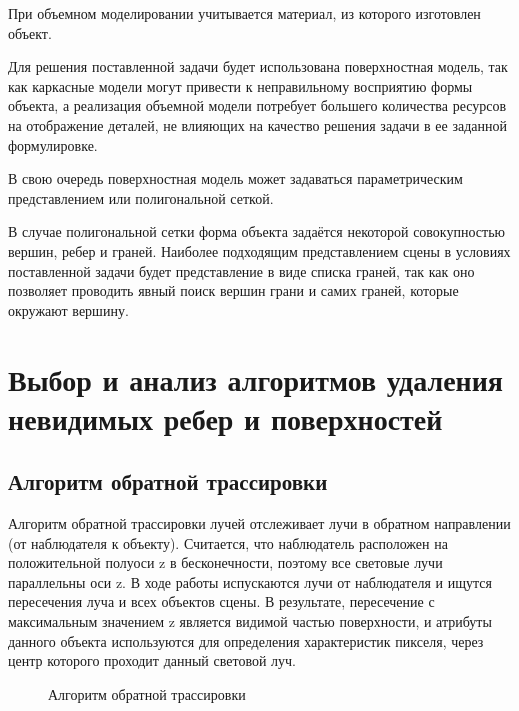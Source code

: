 При объемном моделировании учитывается материал, из которого изготовлен объект.

Для решения поставленной задачи будет использована поверхностная модель, так как каркасные модели могут привести к неправильному восприятию формы объекта, а реализация объемной модели потребует большего количества ресурсов на отображение деталей, не влияющих на качество решения задачи в ее заданной формулировке.

В свою очередь поверхностная модель может задаваться параметрическим представлением или полигональной сеткой.

В случае полигональной сетки форма объекта задаётся некоторой совокупностью вершин, ребер и граней. Наиболее подходящим представлением сцены в условиях поставленной задачи будет представление в виде списка граней, так как оно позволяет проводить явный поиск вершин грани и самих граней, которые окружают вершину.

\section{Выбор и анализ алгоритмов удаления невидимых ребер и поверхностей}

\subsection{Алгоритм обратной трассировки}

Алгоритм обратной трассировки лучей отслеживает лучи в обратном направлении (от наблюдателя к объекту). Считается, что наблюдатель расположен на положительной полуоси z в бесконечности, поэтому все световые лучи параллельны оси z. В ходе работы испускаются лучи от наблюдателя и ищутся пересечения луча и всех объектов сцены. В результате, пересечение с максимальным значением z является видимой частью поверхности, и атрибуты данного объекта используются для определения характеристик пикселя, через центр которого проходит данный световой луч. 

\begin{figure}[ph!]
	\caption{Алгоритм обратной трассировки}
	\label{fig:trace}
\end{figure}

